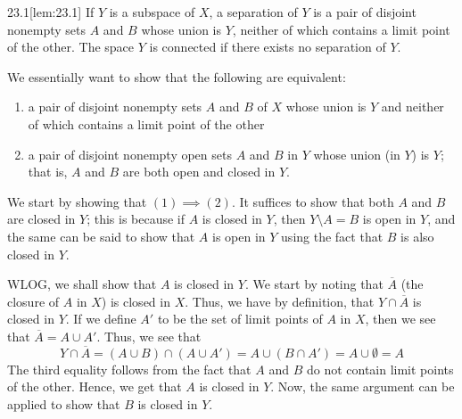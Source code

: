 \begin{thmBox}[Lemma]{23.1}[lem:23.1]
    If \( Y \) is a subspace of \( X \), a separation of \( Y \) is a pair of 
    disjoint nonempty sets \( A \) and \( B \) whose union is \( Y \),
    neither of which contains a limit point of the other.
    The space \( Y \) is connected if there exists no separation of \( Y \).

    \baseRule

    \begin{proofBox}
        We essentially want to show that the following are equivalent: 
        \begin{enumerate}
            \item a pair of disjoint nonempty sets \( A \) and \( B \) of 
                \( X \) whose union is \( Y \) and neither of which contains
                a limit point of the other
            \item a pair of disjoint nonempty open sets \( A \) and \( B \)     
                in \( Y \) whose union (in \( Y \)) is \( Y \); that is, 
                \( A \) and \( B \) are both open and closed in \( Y \).
        \end{enumerate}
        We start by showing that \( ( 1 ) \implies ( 2 ) \).
        It suffices to show that both \( A \) and \( B \) are closed in \( Y \);
        this is because if \( A \) is closed in \( Y \), then 
        \( Y \setminus A = B \) is open in \( Y \), and the same can be said
        to show that \( A \) is open in \( Y \) using the fact that \( B \) is 
        also closed in \( Y \).

        \baseSkip

        WLOG, we shall show that \( A \) is closed in \( Y \).
        We start by noting that \( \overline{ A } \) (the closure of \( A \) in
        \( X \)) is closed in \( X \).
        Thus, we have by definition, that \( Y \cap \overline{ A } \) is closed
        in \( Y \).
        If we define \( A' \) to be the set of limit points of \( A \) in 
        \( X \), then we see that \( \overline{ A } = A \cup A' \).
        Thus, we see that 
        \begin{equation*}
            Y \cap \overline{ A }
            =
            ( A \cup B ) \cap ( A \cup A' )
            =
            A \cup ( B \cap A' )
            =
            A \cup \emptyset
            =
            A
        \end{equation*}
        The third equality follows from the fact that \( A \) and \( B \) do
        not contain limit points of the other.
        Hence, we get that \( A \) is closed in \( Y \).
        Now, the same argument can be applied to show that \( B \) is closed in
        \( Y \).
        

\end{proofBox}
\end{thmBox}
